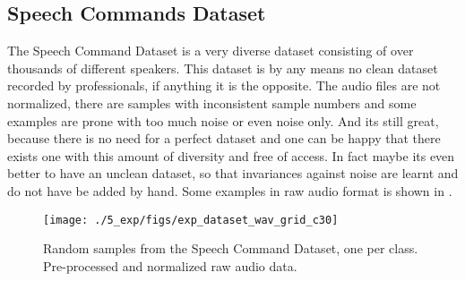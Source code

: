 
\subsection{Speech Commands Dataset}\label{sec:exp_dataset_speech_cmd}
The Speech Command Dataset \cite{Warden2018} is a very diverse dataset consisting of over thousands of different speakers. This dataset is by any means no clean dataset recorded by professionals, if anything it is the opposite. 
The audio files are not normalized, there are samples with inconsistent sample numbers and some examples are prone with too much noise or even noise only.
And its still great, because there is no need for a perfect dataset and one can be happy that there exists one with this amount of diversity and free of access.
In fact maybe its even better to have an unclean dataset, so that invariances against noise are learnt and do not have be added by hand.
Some examples in raw audio format is shown in .
\begin{figure}[!ht]
  \centering
    \texttt{[image: ./5\_exp/figs/exp\_dataset\_wav\_grid\_c30]}
  \caption{Random samples from the Speech Command Dataset, one per class. Pre-processed and normalized raw audio data.}
  \label{fig:exp_dataset_wav_grid_c30}
\end{figure}
\FloatBarrier
\noindent